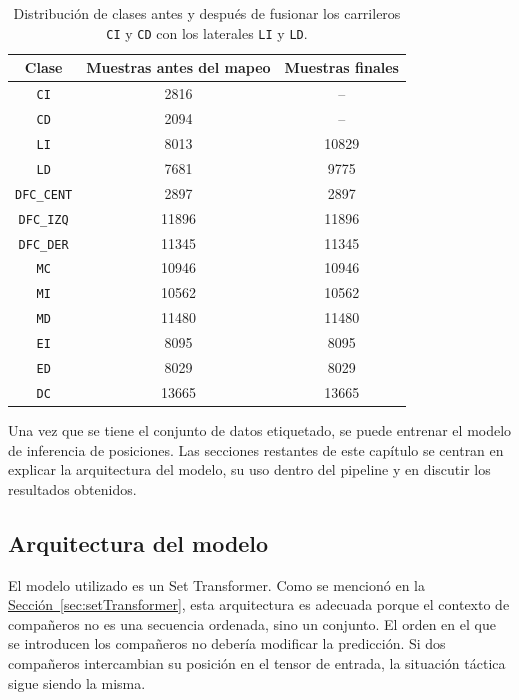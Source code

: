 \begin{table}[H]
\centering
\scriptsize
\begin{tabular}{c|c|c}
\textbf{Clase} & \textbf{Muestras antes del mapeo} & \textbf{Muestras finales} \\
\hline\hline
\texttt{CI} & 2816 & -- \\
\hline
\texttt{CD} & 2094 & -- \\
\hline
\texttt{LI} & 8013 & 10829 \\
\hline
\texttt{LD} & 7681 & 9775 \\
\hline
\texttt{DFC\_CENT} & 2897 & 2897 \\
\hline
\texttt{DFC\_IZQ} & 11896 & 11896 \\
\hline
\texttt{DFC\_DER} & 11345 & 11345 \\
\hline
\texttt{MC} & 10946 & 10946 \\
\hline
\texttt{MI} & 10562 & 10562 \\
\hline
\texttt{MD} & 11480 & 11480 \\
\hline
\texttt{EI} & 8095 & 8095 \\
\hline
\texttt{ED} & 8029 & 8029 \\
\hline
\texttt{DC} & 13665 & 13665 \\
\hline
\end{tabular}
\caption[Distribución de clases posicionales]{Distribución de clases antes y después de fusionar los carrileros \texttt{CI} y \texttt{CD} con los laterales \texttt{LI} y \texttt{LD}.}
\label{tab:position_class_distribution}
\end{table}


Una vez que se tiene el conjunto de datos etiquetado, se puede entrenar el modelo de inferencia de posiciones. Las secciones restantes de este capítulo se centran en explicar la arquitectura del modelo, su uso dentro del pipeline y en discutir los resultados obtenidos.


\subsection{Arquitectura del modelo}
\label{subsec:arquitectura-modelo-posicional}

El modelo utilizado es un Set Transformer. Como se mencionó en la \hyperref[sec:setTransformer]{Sección~\ref*{sec:setTransformer}}, esta arquitectura es adecuada porque el contexto de compañeros no es una secuencia ordenada, sino un conjunto. El orden en el que se introducen los compañeros no debería modificar la predicción. Si dos compañeros intercambian su posición en el tensor de entrada, la situación táctica sigue siendo la misma.

